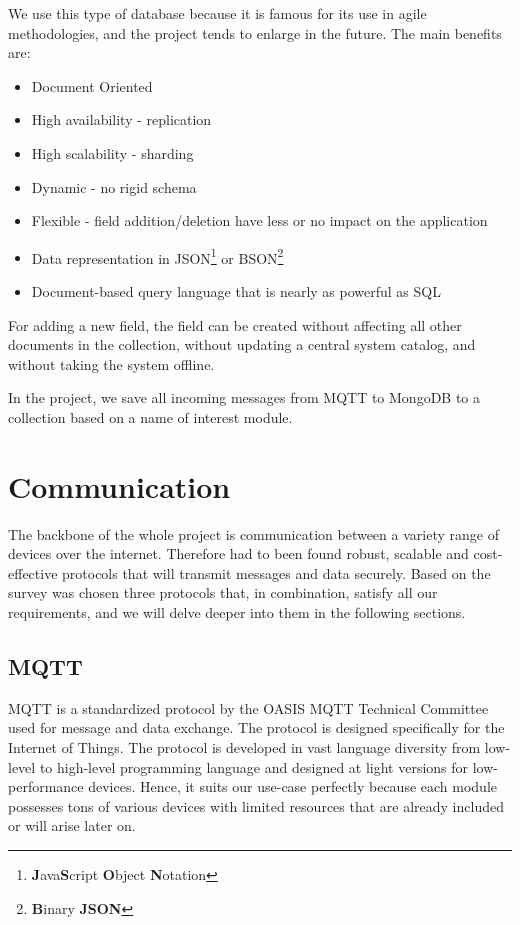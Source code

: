 We use this type of database because it is famous for its use in agile methodologies, and the project tends to enlarge in the future. The main benefits are:
\begin{itemize}
	\item Document Oriented
	\item High availability - replication
	\item High scalability - sharding
	\item Dynamic - no rigid schema
	\item Flexible - field addition/deletion have less or no impact on the application
	\item Data representation in JSON\footnote{\textbf{J}ava\textbf{S}cript \textbf{O}bject \textbf{N}otation} or BSON\footnote{\textbf{B}inary \textbf{JSON}}
	\item Document-based query language that is nearly as powerful as SQL
\end{itemize}

For adding a new field, the field can be created without affecting all other documents in the collection, without updating a central system catalog, and without taking the system offline. 

In the project, we save all incoming messages from MQTT to MongoDB to a collection based on a name of interest module.

\section{Communication}

The backbone of the whole project is communication between a variety range of devices over the internet. Therefore had to been found robust, scalable and cost-effective protocols that will transmit messages and data securely. Based on the survey was chosen three protocols that, in combination, satisfy all our requirements, and we will delve deeper into them in the following sections.

\subsection{MQTT}

MQTT \citep{mqtt_malý_2016} is a standardized protocol by the OASIS MQTT Technical Committee used for message and data exchange. The protocol is designed specifically for the Internet of Things. The protocol is developed in vast language diversity from low-level to high-level programming language and designed at light versions for low-performance devices. Hence, it suits our use-case perfectly because each module possesses tons of various devices with limited resources that are already included or will arise later on.

